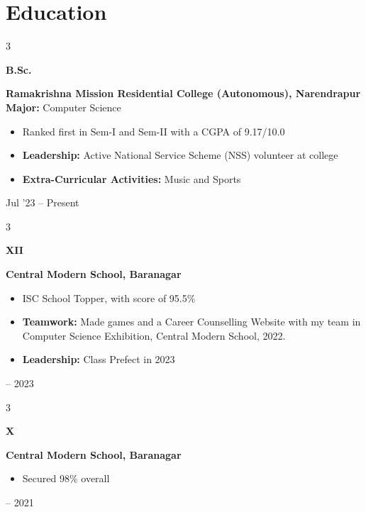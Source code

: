 \documentclass[10pt, letterpaper]{article}
\newenvironment{highlights}{
    \begin{itemize}[
        topsep=0.10 cm,
        parsep=0.10 cm,
        partopsep=0pt,
        itemsep=0pt,
        leftmargin=0.4 cm + 10pt
    ]
}{
    \end{itemize}
} %
\newenvironment{threecolentry}[3][]{
    \onecolentry
    \def\thirdColumn{#3}
    \setcolumnwidth{1 cm, \fill, 4.5 cm}
    \begin{paracol}{3}
    {\raggedright #2} \switchcolumn
}{
    \switchcolumn \raggedleft \thirdColumn
    \end{paracol}
    \endonecolentry
} %
\begin{document}
    \section{Education}
        \begin{threecolentry}{\textbf{B.Sc.}}{
            Jul '23 – Present
        }
            \textbf{Ramakrishna Mission Residential College (Autonomous), Narendrapur} \\
            \textbf{Major:} Computer Science
            \begin{highlights}
                \item Ranked first in Sem-I and Sem-II with a CGPA of 9.17/10.0 
                \item \textbf{Leadership:} Active National Service Scheme (NSS) volunteer at college
                \item \textbf{Extra-Curricular Activities:} Music and Sports 
            \end{highlights}
        \end{threecolentry}

        \begin{threecolentry}{\textbf{XII}}{
            2021 – 2023
        }
            \textbf{Central Modern School, Baranagar}
            \begin{highlights}
                \item ISC School Topper, with score of 95.5\% 
                \item \textbf{Teamwork:} Made games and a Career Counselling Website with my team in Computer Science Exhibition, Central Modern School, 2022.
                \item \textbf{Leadership:} Class Prefect in 2023
            \end{highlights}
        \end{threecolentry}

        \begin{threecolentry}{\textbf{X}}{
            2009 – 2021
        }
            \textbf{Central Modern School, Baranagar}
            \begin{highlights}
                \item Secured 98\% overall 
            \end{highlights}
        \end{threecolentry}
    
\end{document}
